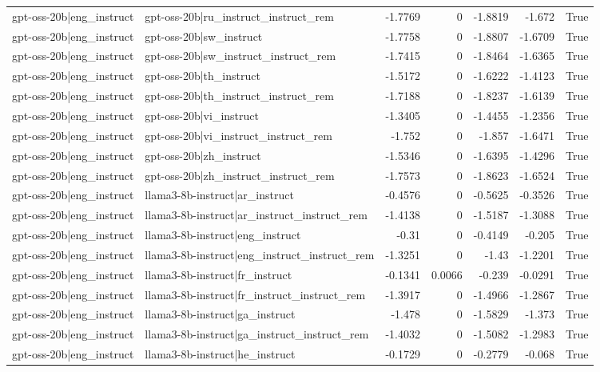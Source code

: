 \begin{table}
\begin{tabular}{l l r r r r l}
gpt-oss-20b|eng_instruct & gpt-oss-20b|ru_instruct_instruct_rem & -1.7769 & 0 & -1.8819 & -1.672 & True \\
gpt-oss-20b|eng_instruct & gpt-oss-20b|sw_instruct & -1.7758 & 0 & -1.8807 & -1.6709 & True \\
gpt-oss-20b|eng_instruct & gpt-oss-20b|sw_instruct_instruct_rem & -1.7415 & 0 & -1.8464 & -1.6365 & True \\
gpt-oss-20b|eng_instruct & gpt-oss-20b|th_instruct & -1.5172 & 0 & -1.6222 & -1.4123 & True \\
gpt-oss-20b|eng_instruct & gpt-oss-20b|th_instruct_instruct_rem & -1.7188 & 0 & -1.8237 & -1.6139 & True \\
gpt-oss-20b|eng_instruct & gpt-oss-20b|vi_instruct & -1.3405 & 0 & -1.4455 & -1.2356 & True \\
gpt-oss-20b|eng_instruct & gpt-oss-20b|vi_instruct_instruct_rem & -1.752 & 0 & -1.857 & -1.6471 & True \\
gpt-oss-20b|eng_instruct & gpt-oss-20b|zh_instruct & -1.5346 & 0 & -1.6395 & -1.4296 & True \\
gpt-oss-20b|eng_instruct & gpt-oss-20b|zh_instruct_instruct_rem & -1.7573 & 0 & -1.8623 & -1.6524 & True \\
gpt-oss-20b|eng_instruct & llama3-8b-instruct|ar_instruct & -0.4576 & 0 & -0.5625 & -0.3526 & True \\
gpt-oss-20b|eng_instruct & llama3-8b-instruct|ar_instruct_instruct_rem & -1.4138 & 0 & -1.5187 & -1.3088 & True \\
gpt-oss-20b|eng_instruct & llama3-8b-instruct|eng_instruct & -0.31 & 0 & -0.4149 & -0.205 & True \\
gpt-oss-20b|eng_instruct & llama3-8b-instruct|eng_instruct_instruct_rem & -1.3251 & 0 & -1.43 & -1.2201 & True \\
gpt-oss-20b|eng_instruct & llama3-8b-instruct|fr_instruct & -0.1341 & 0.0066 & -0.239 & -0.0291 & True \\
gpt-oss-20b|eng_instruct & llama3-8b-instruct|fr_instruct_instruct_rem & -1.3917 & 0 & -1.4966 & -1.2867 & True \\
gpt-oss-20b|eng_instruct & llama3-8b-instruct|ga_instruct & -1.478 & 0 & -1.5829 & -1.373 & True \\
gpt-oss-20b|eng_instruct & llama3-8b-instruct|ga_instruct_instruct_rem & -1.4032 & 0 & -1.5082 & -1.2983 & True \\
gpt-oss-20b|eng_instruct & llama3-8b-instruct|he_instruct & -0.1729 & 0 & -0.2779 & -0.068 & True \\

\end{tabular}
\end{table}
